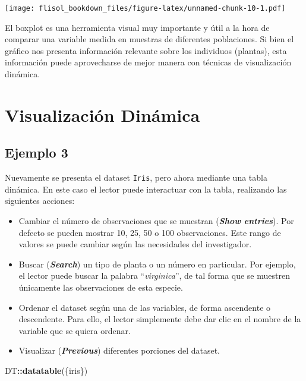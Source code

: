 \documentclass[
]{book}
\newenvironment{Shaded}{\begin{snugshade}}{\end{snugshade}}
\newcommand{\KeywordTok}[1]{\textcolor[rgb]{0.13,0.29,0.53}{\textbf{#1}}}
\newcommand{\NormalTok}[1]{#1}
\newcommand{\OperatorTok}[1]{\textcolor[rgb]{0.81,0.36,0.00}{\textbf{#1}}}
\providecommand{\tightlist}{%
  \setlength{\itemsep}{0pt}\setlength{\parskip}{0pt}}
\begin{document}
\texttt{[image: flisol\_bookdown\_files/figure-latex/unnamed-chunk-10-1.pdf]}

El boxplot es una herramienta visual muy importante y útil a la hora de comparar una variable medida en muestras de diferentes poblaciones. Si bien el gráfico nos presenta información relevante sobre los individuos (plantas), esta información puede aprovecharse de mejor manera con técnicas de visualización dinámica.

\hypertarget{visualizaciuxf3n-dinuxe1mica}{%
\section{Visualización Dinámica}\label{visualizaciuxf3n-dinuxe1mica}}

\hypertarget{ejemplo-3}{%
\subsection{Ejemplo 3}\label{ejemplo-3}}

Nuevamente se presenta el dataset \texttt{Iris}, pero ahora mediante una tabla dinámica. En este caso el lector puede interactuar con la tabla, realizando las siguientes acciones:

\begin{itemize}
\tightlist
\item
  Cambiar el número de observaciones que se muestran (\textbf{\emph{Show entries}}). Por defecto se pueden mostrar 10, 25, 50 o 100 observaciones. Este rango de valores se puede cambiar según las necesidades del investigador.
\item
  Buscar (\textbf{\emph{Search}}) un tipo de planta o un número en particular. Por ejemplo, el lector puede buscar la palabra ``\emph{virginica}'', de tal forma que se muestren únicamente las observaciones de esta especie.
\item
  Ordenar el dataset según una de las variables, de forma ascendente o descendente. Para ello, el lector simplemente debe dar clic en el nombre de la variable que se quiera ordenar.
\item
  Visualizar (\textbf{\emph{Previous}}) diferentes porciones del dataset.
\end{itemize}

\begin{Shaded}
\begin{Highlighting}[]
\NormalTok{DT}\OperatorTok{::}\KeywordTok{datatable}\NormalTok{(\{iris\})}
\end{Highlighting}
\end{Shaded}
\end{document}
